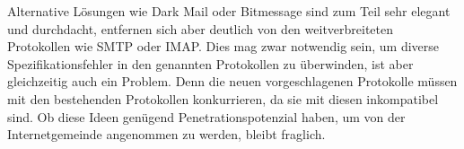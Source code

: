Alternative Lösungen wie Dark Mail  oder Bitmessage  sind zum Teil sehr elegant und durchdacht, entfernen sich aber deutlich von den weitverbreiteten Protokollen wie SMTP oder IMAP. Dies mag zwar notwendig sein, um diverse Spezifikationsfehler in den genannten Protokollen zu überwinden, ist aber gleichzeitig auch ein Problem. Denn die neuen vorgeschlagenen Protokolle müssen mit den bestehenden Protokollen konkurrieren, da sie mit diesen inkompatibel sind. Ob diese Ideen genügend Penetrationspotenzial haben, um von der Internetgemeinde angenommen zu werden, bleibt fraglich.
